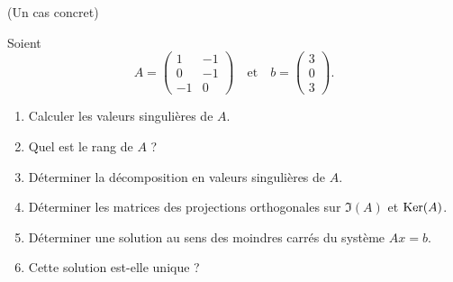 \documentclass[a4paper,12pt,reqno]{amsart}
\begin{document}
\begin{exo} (Un cas concret)

    Soient
    $$
        A = \begin{pmatrix}
                1  & -1 \\
                0  & -1 \\
                -1 & 0
            \end{pmatrix}
        \quad\text{et}\quad
        b = \begin{pmatrix}
                3 \\
                0 \\
                3
            \end{pmatrix}.
    $$
    \begin{enumerate}
        \item Calculer les valeurs singulières de $A$.

        \item Quel est le rang de $A$ ?

        \item Déterminer la décomposition en valeurs singulières de $A$.

        \item Déterminer les matrices des projections orthogonales sur $\Im(A)$ et $\operatorname{Ker}(A)$.

        \item Déterminer une solution au sens des moindres carrés du système $Ax=b$.

        \item Cette solution est-elle unique ?
    \end{enumerate}
\end{exo}
\end{document}
